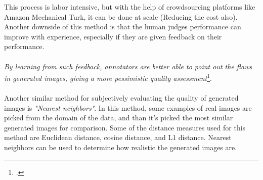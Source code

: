 This process is labor intensive, but with the help of crowdsourcing platforms like Amazon Mechanical Turk, 
it can be done at scale (Reducing the cost also).\\
Another downside of this method is that the human judges performance can improve with experience, especially if they are given feedback on their performance.\\\\
\emph{By learning from such feedback, annotators are better able to point out the flaws in generated images, giving a more pessimistic quality assessment}\footcite{paper:ganeval}.\\\\

Another similar method for subjectively evaluating the quality of generated images is \emph{"Nearest neighbors"}.
In this method, some examples of real images are picked from the domain of the data, and than it's picked the most similar generated images for comparison.
Some of the distance measures used for this method are Euclidean distance, cosine distance, and L1 distance.
Nearest neighbors can be used to determine how realistic the generated images are.


